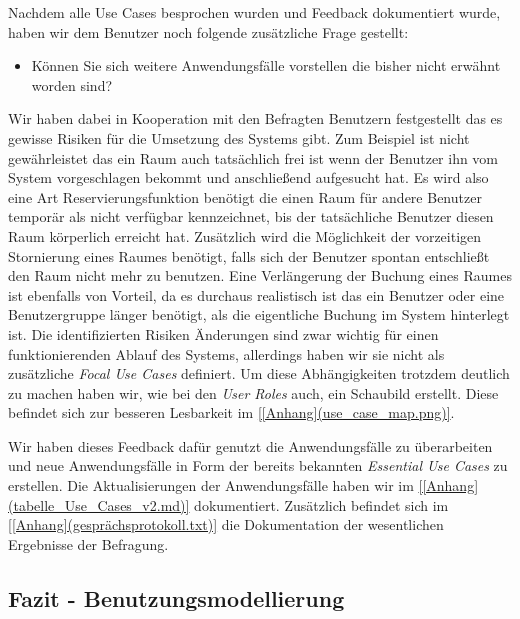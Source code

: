 Nachdem alle Use Cases besprochen wurden und Feedback dokumentiert wurde, haben
wir dem Benutzer noch folgende zusätzliche Frage gestellt:

\begin{itemize}
	\item Können Sie sich weitere Anwendungsfälle vorstellen die bisher nicht erwähnt worden sind?
\end{itemize}

Wir haben dabei in Kooperation mit den Befragten Benutzern festgestellt das es
gewisse Risiken für die Umsetzung des Systems gibt. Zum Beispiel ist nicht
gewährleistet das ein Raum auch tatsächlich frei ist wenn der Benutzer ihn vom
System vorgeschlagen bekommt und anschließend aufgesucht hat. Es wird also eine
Art Reservierungsfunktion benötigt die einen Raum für andere Benutzer temporär
als nicht verfügbar kennzeichnet, bis der tatsächliche Benutzer diesen
Raum körperlich erreicht hat. Zusätzlich  wird die Möglichkeit der vorzeitigen
Stornierung eines Raumes benötigt, falls sich der Benutzer spontan entschließt
den Raum nicht mehr zu benutzen.
Eine Verlängerung der Buchung eines Raumes ist ebenfalls von Vorteil, da es
durchaus realistisch ist das ein Benutzer oder eine Benutzergruppe länger
benötigt, als die eigentliche Buchung im System hinterlegt ist.
Die identifizierten Risiken \bzw Änderungen sind zwar wichtig für einen
funktionierenden Ablauf des Systems, allerdings haben wir sie nicht als
zusätzliche \textit{Focal Use Cases} definiert. Um diese Abhängigkeiten
trotzdem  deutlich zu machen haben wir, wie bei den \textit{User Roles} auch, ein
Schaubild erstellt. Diese \textit{\citep{[Use Case Map](Buchverweis)}} befindet sich zur
besseren Lesbarkeit im \ref{[Anhang](use_case_map.png)}.

Wir haben dieses Feedback dafür genutzt die Anwendungsfälle zu überarbeiten
und neue Anwendungsfälle in Form der bereits bekannten \textit{Essential Use Cases}
zu erstellen. Die Aktualisierungen der Anwendungsfälle haben wir im
\ref{[Anhang](tabelle_Use_Cases_v2.md)} dokumentiert.
Zusätzlich befindet sich im \ref{[Anhang](gesprächsprotokoll.txt)} die Dokumentation
der wesentlichen Ergebnisse der Befragung.


\subsection{Fazit - Benutzungsmodellierung}
\label{sec:Fazit - Benutzungsmodellierung}

